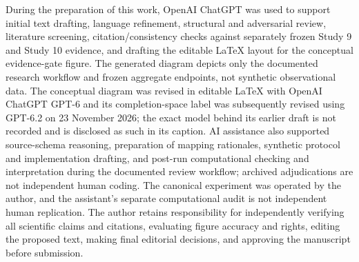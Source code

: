 \documentclass[preprint,12pt]{elsarticle}
\begin{document}
During the preparation of this work, OpenAI ChatGPT was used to support initial text drafting, language refinement, structural and adversarial review, literature screening, citation/consistency checks against separately frozen Study 9 and Study 10 evidence, and drafting the editable LaTeX layout for the conceptual evidence-gate figure. The generated diagram depicts only the documented research workflow and frozen aggregate endpoints, not synthetic observational data. The conceptual diagram was revised in editable LaTeX with OpenAI ChatGPT GPT-6 and its completion-space label was subsequently revised using GPT-6.2 on 23 November 2026; the exact model behind its earlier draft is not recorded and is disclosed as such in its caption. AI assistance also supported source-schema reasoning, preparation of mapping rationales, synthetic protocol and implementation drafting, and post-run computational checking and interpretation during the documented review workflow; archived adjudications are not independent human coding. The canonical experiment was operated by the author, and the assistant's separate computational audit is not independent human replication. The author retains responsibility for independently verifying all scientific claims and citations, evaluating figure accuracy and rights, editing the proposed text, making final editorial decisions, and approving the manuscript before submission.



\end{document}
